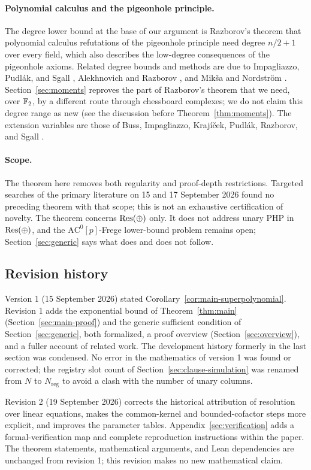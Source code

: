 \paragraph{Polynomial calculus and the pigeonhole principle.}
The degree lower bound at the base of our argument is Razborov's theorem
\cite{Raz98} that polynomial calculus refutations of the pigeonhole principle
need degree \(n/2+1\) over every field, which also describes the low-degree
consequences of the pigeonhole axioms. Related degree bounds and methods are
due to Impagliazzo, Pudl\'ak, and Sgall \cite{IPS99}, Alekhnovich and Razborov
\cite{AR03}, and Mik\v{s}a and Nordstr\"om \cite{MN15}. Section~\ref{sec:moments}
reproves the part of Razborov's theorem that we need, over \(\mathbb F_2\), by a
different route through chessboard complexes; we do not claim this degree
range as new (see the discussion before Theorem~\ref{thm:moments}).
The extension variables are those of Buss, Impagliazzo, Kraj\'i\v{c}ek,
Pudl\'ak, Razborov, and Sgall \cite{BIKPRS}.

\paragraph{Scope.}
The theorem here removes both regularity and proof-depth restrictions.
Targeted searches of the primary literature on 15 and 17 September 2026 found
no preceding theorem with that scope; this is not an exhaustive certification
of novelty. The theorem concerns \(\mathrm{Res}(\oplus)\) only. It does not address unary
PHP in \(\mathrm{Res}(\oplus)\), and the \(\mathrm{AC}^0[p]\)-Frege lower-bound problem
remains open; Section~\ref{sec:generic} says what does and does not follow.

\subsection{Revision history}
Version 1 (15 September 2026) stated Corollary~\ref{cor:main-superpolynomial}.
Revision 1 adds the exponential bound of Theorem~\ref{thm:main}
(Section~\ref{sec:main-proof}) and the generic sufficient condition of
Section~\ref{sec:generic}, both formalized, a proof overview
(Section~\ref{sec:overview}), and a fuller account of related work. The
development history formerly in the last section was condensed. No error in
the mathematics of version 1 was found or corrected; the registry slot count
of Section~\ref{sec:clause-simulation} was renamed from \(N\) to
\(N_{\mathrm{reg}}\) to avoid a clash with the number of unary columns.

Revision 2 (19 September 2026) corrects the historical attribution of
resolution over linear equations, makes the common-kernel and
bounded-cofactor steps more explicit, and improves the parameter tables.
Appendix~\ref{sec:verification} adds a formal-verification map and complete
reproduction instructions within the paper. The theorem statements,
mathematical arguments, and Lean dependencies are unchanged from revision 1;
this revision makes no new mathematical claim.

